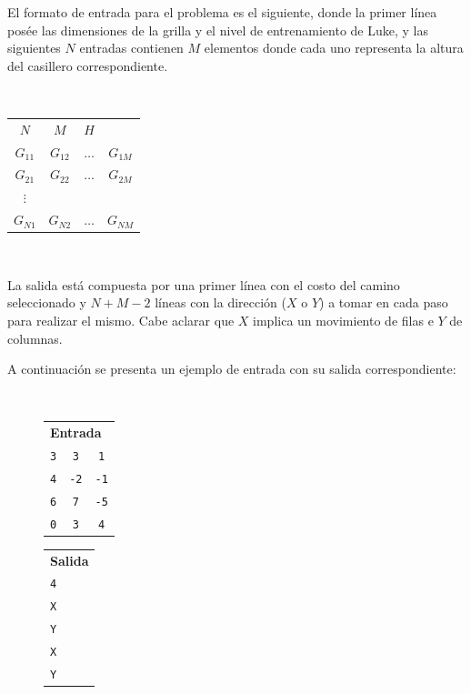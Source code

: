 	El formato de entrada para el problema es el siguiente, donde la primer
	línea posée las dimensiones de la grilla y el nivel de entrenamiento de
	Luke, y las siguientes $N$ entradas contienen $M$ elementos donde cada uno
	representa la altura del casillero correspondiente.

	~

	\begin{tabular}{cccc}
		$N$ & $M$ & $H$ & \\
		$G_{11}$ & $G_{12}$ & $\dots$ & $G_{1M}$ \\
		$G_{21}$ & $G_{22}$ & $\dots$ & $G_{2M}$ \\
		$\vdots$ & & & \\
		$G_{N1}$ & $G_{N2}$ & $\dots$ & $G_{NM}$ \\
	\end{tabular}

	~

	La salida está compuesta por una primer línea con el costo del camino
	seleccionado y $N + M - 2$ líneas con la dirección ($X$ o $Y$) a tomar en cada paso para
	realizar el mismo. Cabe aclarar que $X$ implica un movimiento de filas e $Y$
	de columnas.

	A continuación se presenta un ejemplo de entrada con su salida
	correspondiente:

	~

	\begin{figure}[H]
		\centering
		\begin{minipage}[t]{0.25\textwidth}
			\begin{tabular}[t]{ccc}
				\multicolumn{3}{l}{\textbf{Entrada}} \\
				\texttt{3} & \texttt{3} & \texttt{1} \\
				\texttt{4} & \texttt{-2} & \texttt{-1} \\
				\texttt{6} & \texttt{7} & \texttt{-5} \\
				\texttt{0} & \texttt{3} & \texttt{4} \\
			\end{tabular}
		\end{minipage}
		\begin{minipage}[t]{0.10\textwidth}
			\begin{tabular}[t]{l}
				\textbf{Salida} \\
				\texttt{4} \\
				\texttt{X} \\
				\texttt{Y} \\
				\texttt{X} \\
				\texttt{Y} \\
			\end{tabular}
		\end{minipage}
	\end{figure}

